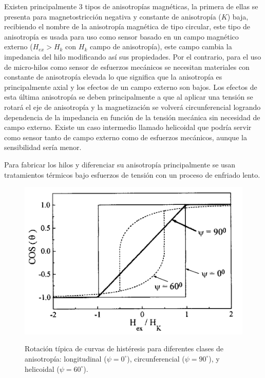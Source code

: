 \documentclass[12pt,letterpaper]{article}
\numberwithin{equation}{section}
\begin{document}
Existen principalmente 3 tipos de anisotropías magnéticas, la primera de ellas se presenta para magnetostricción negativa y constante de anisotropía ($K$) baja, recibiendo el nombre de la anisotropía magnética de tipo circular, este tipo de anisotropía es usada para uso como sensor basado en un campo magnético externo ($H_{ex}>H_k$ con $H_k$ campo de anisotropía), este campo cambia la impedancia del hilo modificando así sus propiedades. Por el contrario, para el uso de micro-hilos como sensor de esfuerzos mecánicos se necesitan materiales con constante de anisotropía elevada lo que significa que la anisotropía es principalmente axial y los efectos de un campo externo son bajos. Los efectos de esta última anisotropía se deben principalmente a que al aplicar una tensión se rotará el eje de anisotropía y la magnetización se volverá circunferencial logrando dependencia de la impedancia en función de la tensión mecánica sin necesidad de campo externo. Existe un caso intermedio llamado helicoidal que podría servir como sensor tanto de campo externo como de esfuerzos mecánicos, aunque la sensibilidad sería menor.

Para fabricar los hilos y diferenciar su anisotropía principalmente se usan tratamientos térmicos bajo esfuerzos de tensión con un proceso de enfriado lento.
\begin{figure}[H]
	\centering\includegraphics[scale=0.4]{Imagenes/Rot_hysteresis.png}\\
	\caption{Rotación típica de curvas de histéresis para diferentes clases de anisotropía: longitudinal ($\psi=0^\circ$), circunferencial ($\psi=90^\circ$), y helicoidal ($\psi=60^\circ$).}
	\label{fig:Rot_hysteresis}
\end{figure} 
\end{document}
